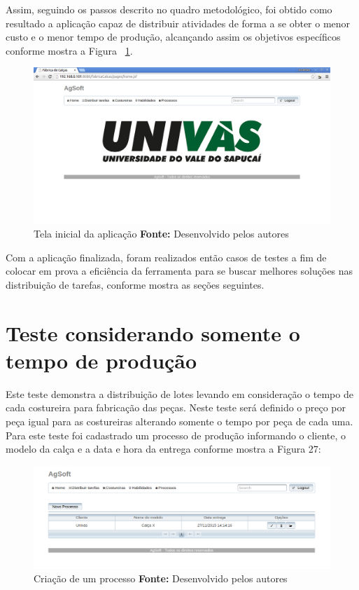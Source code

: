 \par Assim, seguindo os passos descrito no quadro metodológico, foi obtido como resultado a aplicação
capaz de distribuir atividades de forma a se obter o menor custo e o menor tempo de produção, 
alcançando assim os objetivos específicos conforme mostra a Figura ~\ref{fig:tela_inicial_da_aplicação}.

\newpage

\begin{figure}[h!]
	\centerline{\includegraphics[scale=0.3]{./imagens/tela_inicial.png}}
	\caption[Tela inicial da aplicação]
	{Tela inicial da aplicação \textbf{Fonte:} Desenvolvido pelos autores}
	\label{fig:tela_inicial_da_aplicação}
\end{figure}


\par Com a aplicação finalizada, foram realizados então casos de testes a fim de colocar em prova a eficiência da ferramenta para se 
buscar melhores soluções nas distribuição de tarefas, conforme mostra as seções
seguintes.


\section{Teste considerando somente o tempo de produção}

\par Este teste demonstra a distribuição de lotes levando em consideração o
tempo de cada costureira para fabricação das peças. Neste teste será definido o
preço por peça igual para as costureiras alterando somente o tempo por peça de
cada uma. Para este teste foi cadastrado um processo de produção informando o
cliente, o modelo da calça e a data e hora da entrega conforme mostra a Figura 27:
\newpage

\begin{figure}[h!]
	\centerline{\includegraphics[scale=0.4]{./imagens/teste_processo.png}}
	\caption[Criação de um processo]
	{Criação de um processo \textbf{Fonte:} Desenvolvido pelos autores}
	\label{fig:exemplo1}
\end{figure}

